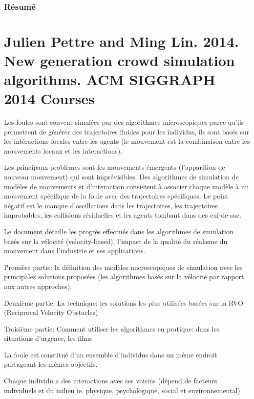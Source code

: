 \documentclass[11pt]{report}
\begin{document}
\chapter*{}

\section*{Résumé}


\part{Julien Pettre and Ming Lin. 2014. New generation crowd simulation algorithms. ACM SIGGRAPH 2014 Courses}

Les foules sont souvent simulées par des algorithmes microscopiques parce qu'ils permettent de générer des trajectoires fluides pour les individus, ils sont basés sur les intéractions locales entre les agents (le mouvement est la combinaison entre les mouvements locaux et les interactions).

Les principaux problèmes sont les mouvements émergents (l'apparition de nouveau mouvement) qui sont imprévisibles.
Des algorithmes de simulation de modèles de mouvements et d'interaction consistent à associer chaque modèle à  un mouvement spécifique de la foule avec des trajectoires spécifiques. Le point négatif est le manque d'oscillations dans les trajectoires, les trajectoires improbables, les collisions résiduelles et les agents tombant dans des cul-de-sac.

Le document détaille les progrès effectués dans les algorithmes de simulation basés sur la vélocité (velocity-based), l'impact de la qualité du réalisme du mouvement dans l'industrie et ses applications.

Première partie: la définition des modèles microscopiques de simulation avec les principales solutions proposées (les algorithmes basés sur la vélocité par rapport aux autres approches).

Deuxième partie: La technique: les solutions les plus utilisées basées sur la RVO (Reciprocal Velocity Obstacles)

Troisième partie: Comment utiliser les algorithmes en pratique: dans les situations d'urgence, les films

La foule est constitué d'un ensemble d'individus dans un même endroit partageant les mêmes objectifs.

Chaque individu a des interactions avec ses voisins (dépend de facteurs individuels et du milieu ie. physique, psychologique, social et environnemental)
\end{document}
